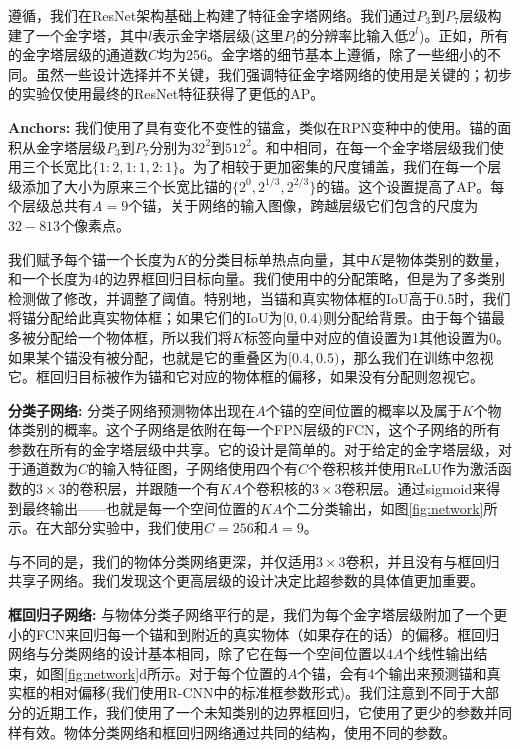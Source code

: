 \documentclass{ctexart}
\begin{document}
遵循\cite{fpn}，我们在ResNet架构基础上构建了特征金字塔网络。我们通过$P_3$到$P_7$层级构建了一个金字塔，其中$l$表示金字塔层级(这里$P_l$的分辨率比输入低$2^l$)。正如\cite{fpn}，所有的金字塔层级的通道数$C$均为256。金字塔的细节基本上遵循\cite{fpn}，除了一些细小的不同。虽然一些设计选择并不关键，我们强调特征金字塔网络的使用是关键的；初步的实验仅使用最终的ResNet特征获得了更低的AP。\par
\textbf{Anchors:} 我们使用了具有变化不变性的锚盒，类似在RPN变种\cite{fpn}中的使用。锚的面积从金字塔层级$P_3$到$P_7$分别为$32^2$到$512^2$。和\cite{fpn}中相同，在每一个金字塔层级我们使用三个长宽比$\{ 1:2, 1:1, 2:1 \}$。为了相较于\cite{fpn}更加密集的尺度铺盖，我们在每一个层级添加了大小为原来三个长宽比锚的$\{ 2^0, 2^{1/3}, 2^{2/3} \}$的锚。这个设置提高了AP。每个层级总共有$A=9$个锚，关于网络的输入图像，跨越层级它们包含的尺度为$32-813$个像素点。\par
我们赋予每个锚一个长度为$K$的分类目标单热点向量，其中$K$是物体类别的数量，和一个长度为4的边界框回归目标向量。我们使用\cite{faster_r_cnn}中的分配策略，但是为了多类别检测做了修改，并调整了阈值。特别地，当锚和真实物体框的IoU高于0.5时，我们将锚分配给此真实物体框；如果它们的IoU为$[0, 0.4)$则分配给背景。由于每个锚最多被分配给一个物体框，所以我们将$K$标签向量中对应的值设置为1其他设置为0。如果某个锚没有被分配，也就是它的重叠区为$[0.4, 0.5)$，那么我们在训练中忽视它。框回归目标被作为锚和它对应的物体框的偏移，如果没有分配则忽视它。\par
\textbf{分类子网络:} 分类子网络预测物体出现在$A$个锚的空间位置的概率以及属于$K$个物体类别的概率。这个子网络是依附在每一个FPN层级的FCN，这个子网络的所有参数在所有的金字塔层级中共享。它的设计是简单的。对于给定的金字塔层级，对于通道数为$C$的输入特征图，子网络使用四个有$C$个卷积核并使用ReLU作为激活函数的$3 \times 3$的卷积层，并跟随一个有$K A$个卷积核的$3\times 3$卷积层。通过sigmoid来得到最终输出——也就是每一个空间位置的$K A$个二分类输出，如图\ref{fig:network}所示。在大部分实验中，我们使用$C=256$和$A=9$。\par
与\cite{faster_r_cnn}不同的是，我们的物体分类网络更深，并仅适用$3\times 3$卷积，并且没有与框回归共享子网络。我们发现这个更高层级的设计决定比超参数的具体值更加重要。\par
\textbf{框回归子网络:} 与物体分类子网络平行的是，我们为每个金字塔层级附加了一个更小的FCN来回归每一个锚和到附近的真实物体（如果存在的话）的偏移。框回归网络与分类网络的设计基本相同，除了它在每一个空间位置以$4A$个线性输出结束，如图\ref{fig:network}d所示。对于每个位置的$A$个锚，会有4个输出来预测锚和真实框的相对偏移(我们使用R-CNN中的标准框参数形式)。我们注意到不同于大部分的近期工作，我们使用了一个未知类别的边界框回归，它使用了更少的参数并同样有效。物体分类网络和框回归网络通过共同的结构，使用不同的参数。
\end{document}
